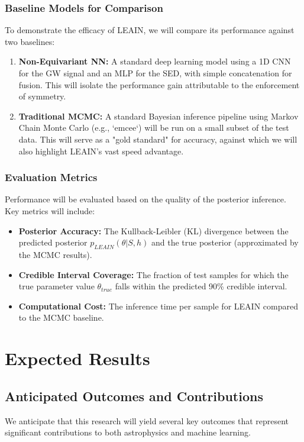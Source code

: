 \documentclass[11pt, a4paper]{article}
\begin{document}
\subsubsection{Baseline Models for Comparison}
To demonstrate the efficacy of LEAIN, we will compare its performance against two baselines:
\begin{enumerate}
    \item \textbf{Non-Equivariant NN:} A standard deep learning model using a 1D CNN for the GW signal and an MLP for the SED, with simple concatenation for fusion. This will isolate the performance gain attributable to the enforcement of symmetry.
    \item \textbf{Traditional MCMC:} A standard Bayesian inference pipeline using Markov Chain Monte Carlo (e.g., `emcee`) will be run on a small subset of the test data. This will serve as a "gold standard" for accuracy, against which we will also highlight LEAIN's vast speed advantage.
\end{enumerate}

\subsubsection{Evaluation Metrics}
Performance will be evaluated based on the quality of the posterior inference. Key metrics will include:
\begin{itemize}
    \item \textbf{Posterior Accuracy:} The Kullback-Leibler (KL) divergence between the predicted posterior $p_{LEAIN}(\theta | S, h)$ and the true posterior (approximated by the MCMC results).
    \item \textbf{Credible Interval Coverage:} The fraction of test samples for which the true parameter value $\theta_{true}$ falls within the predicted 90\% credible interval.
    \item \textbf{Computational Cost:} The inference time per sample for LEAIN compared to the MCMC baseline.
\end{itemize}

\section{Expected Results}

\subsection{Anticipated Outcomes and Contributions}
We anticipate that this research will yield several key outcomes that represent significant contributions to both astrophysics and machine learning.
\end{document}
